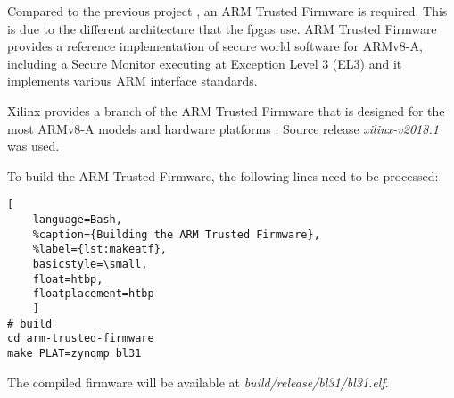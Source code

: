 Compared to the previous project \cite{oldrepo}, an ARM Trusted Firmware is required. This is due to the different architecture that the \glspl{fpga} use. ARM Trusted Firmware provides a reference implementation of secure world software for ARMv8-A, including a Secure Monitor executing at Exception Level 3 (EL3) and it implements various ARM interface standards.

Xilinx provides a branch of the ARM Trusted Firmware that is designed for the most ARMv8-A models and hardware platforms \cite{atf}. Source release \emph{xilinx-v2018.1} was used.

To build the ARM Trusted Firmware, the following lines need to be processed:
\begin{lstlisting}[
	language=Bash,
	%caption={Building the ARM Trusted Firmware},
	%label={lst:makeatf},
	basicstyle=\small,
	float=htbp,
	floatplacement=htbp
	]
# build
cd arm-trusted-firmware
make PLAT=zynqmp bl31
\end{lstlisting}

The compiled firmware will be available at \emph{build/release/bl31/bl31.elf}.